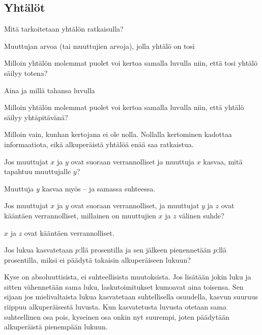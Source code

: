 \subsection*{Yhtälöt}

\begin{tehtava}
Mitä tarkoitetaan yhtälön ratkaisulla?
\begin{vastaus}
Muuttujan arvoa (tai muuttujien arvoja), jolla yhtälö on tosi
\end{vastaus}
\end{tehtava}

\begin{tehtava}
Milloin yhtälön molemmat puolet voi kertoa samalla luvulla niin, että tosi yhtälö säilyy totena?
\begin{vastaus}
Aina ja millä tahansa luvulla
\end{vastaus}
\end{tehtava}

\begin{tehtava}
Milloin yhtälön molemmat puolet voi kertoa samalla luvulla niin, että yhtälö säilyy yhtäpitävänä?
\begin{vastaus}
Milloin vain, kunhan kertojana ei ole nolla. Nollalla kertominen kadottaa informaatiota, eikä alkuperäistä yhtälöä enää saa ratkaistua.
\end{vastaus}
\end{tehtava}

\begin{tehtava}
Jos muuttujat $x$ ja $y$ ovat suoraan verrannolliset ja muuttuja $x$ kasvaa, mitä tapahtuu muuttujalle $y$?
\begin{vastaus}
Muuttuja $y$ kasvaa myös -- ja samassa suhteessa.
\end{vastaus}
\end{tehtava}

\begin{tehtava}
Jos muuttujat $x$ ja $y$ ovat suoraan verrannolliset, ja muuttujat $y$ ja $z$ ovat kääntäen verrannolliset, millainen on muuttujien $x$ ja $z$ välinen suhde?
\begin{vastaus}
$x$ ja $z$ ovat kääntäen verrannolliset.
\end{vastaus}
\end{tehtava}

\begin{tehtava}
Jos lukua kasvatetaan $p$:llä prosentilla ja sen jälkeen pienennetään $p$:llä prosentilla, miksi ei päädytä takaisin alkuperäiseen lukuun?
	\begin{vastaus}
	Kyse on absoluuttisista, ei suhteellisista muutoksista. Jos lisätään jokin luku ja sitten vähennetään sama luku, laskutoimitukset kumoavat aina toisensa. Sen sijaan jos mielivaltaista lukua kasvatetaan suhtellisella osuudella, kasvun suuruus riippuu alkuperäisestä luvusta. Kun kasvatetusta luvusta otetaan sama suhteellinen osa pois, kyseinen osa onkin nyt suurempi, joten päädytään alkuperäistä pienempään lukuun.
	\end{vastaus}
\end{tehtava}

